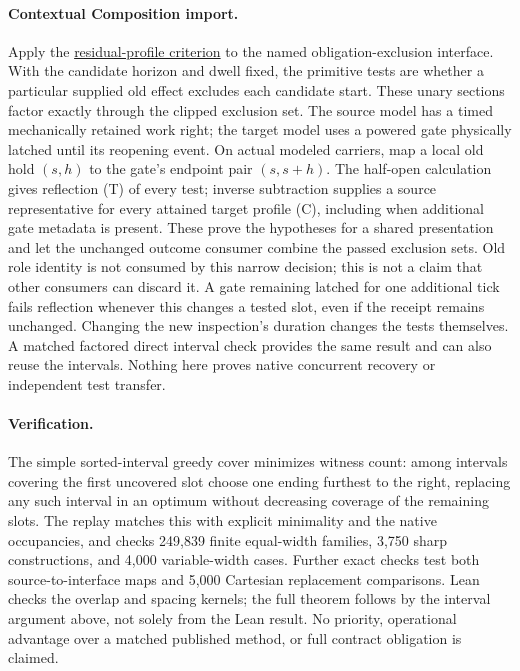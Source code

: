 \documentclass{article}
\begin{document}
\paragraph{Contextual Composition import.}
Apply the \href{https://github.com/eternal-november/eos-research-programmes/blob/main/projects/contextual-composition/feedback-and-concurrency/observable-covers/Residual_Profiles_and_Admission_Reflection.tex}{residual-profile criterion} to the named obligation-exclusion interface. With the candidate horizon and dwell fixed, the primitive tests are whether a particular supplied old effect excludes each candidate start. These unary sections factor exactly through the clipped exclusion set. The source model has a timed mechanically retained work right; the target model uses a powered gate physically latched until its reopening event. On actual modeled carriers, map a local old hold $(s,h)$ to the gate's endpoint pair $(s,s+h)$. The half-open calculation gives reflection (T) of every test; inverse subtraction supplies a source representative for every attained target profile (C), including when additional gate metadata is present. These prove the hypotheses for a shared presentation and let the unchanged outcome consumer combine the passed exclusion sets. Old role identity is not consumed by this narrow decision; this is not a claim that other consumers can discard it. A gate remaining latched for one additional tick fails reflection whenever this changes a tested slot, even if the receipt remains unchanged. Changing the new inspection's duration changes the tests themselves. A matched factored direct interval check provides the same result and can also reuse the intervals. Nothing here proves native concurrent recovery or independent test transfer.

\paragraph{Verification.}
The simple sorted-interval greedy cover minimizes witness count: among intervals covering the first uncovered slot choose one ending furthest to the right, replacing any such interval in an optimum without decreasing coverage of the remaining slots. The replay matches this with explicit minimality and the native occupancies, and checks 249,839 finite equal-width families, 3,750 sharp constructions, and 4,000 variable-width cases. Further exact checks test both source-to-interface maps and 5,000 Cartesian replacement comparisons. Lean checks the overlap and spacing kernels; the full theorem follows by the interval argument above, not solely from the Lean result. No priority, operational advantage over a matched published method, or full contract obligation is claimed.
\end{document}
